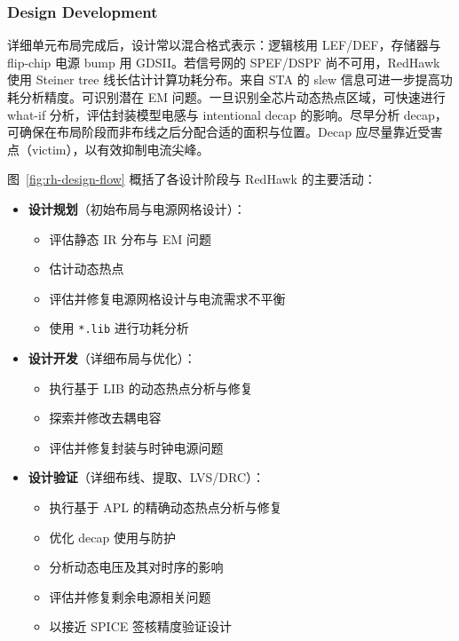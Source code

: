 \subsubsection*{Design Development}

详细单元布局完成后，设计常以混合格式表示：逻辑核用 LEF/DEF，存储器与 flip-chip 电源 bump 用 GDSII。若信号网的 SPEF/DSPF 尚不可用，RedHawk 使用 Steiner tree 线长估计计算功耗分布。来自 STA 的 slew 信息可进一步提高功耗分析精度。可识别潜在 EM 问题。一旦识别全芯片动态热点区域，可快速进行 what-if 分析，评估封装模型电感与 intentional decap 的影响。尽早分析 decap，可确保在布局阶段而非布线之后分配合适的面积与位置。Decap 应尽量靠近受害点（victim），以有效抑制电流尖峰。

\label{fig:rh-design-flow}

图~\ref{fig:rh-design-flow} 概括了各设计阶段与 RedHawk 的主要活动：

\begin{itemize}
  \item \textbf{设计规划}（初始布局与电源网格设计）：
  \begin{itemize}
    \item 评估静态 IR 分布与 EM 问题
    \item 估计动态热点
    \item 评估并修复电源网格设计与电流需求不平衡
    \item 使用 \texttt{*.lib} 进行功耗分析
  \end{itemize}
  \item \textbf{设计开发}（详细布局与优化）：
  \begin{itemize}
    \item 执行基于 LIB 的动态热点分析与修复
    \item 探索并修改去耦电容
    \item 评估并修复封装与时钟电源问题
  \end{itemize}
  \item \textbf{设计验证}（详细布线、提取、LVS/DRC）：
  \begin{itemize}
    \item 执行基于 APL 的精确动态热点分析与修复
    \item 优化 decap 使用与防护
    \item 分析动态电压及其对时序的影响
    \item 评估并修复剩余电源相关问题
    \item 以接近 SPICE 签核精度验证设计
  \end{itemize}
\end{itemize}

